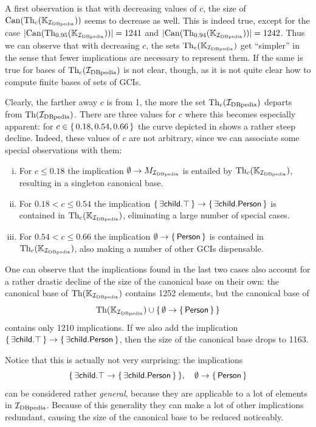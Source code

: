 A first observation is that with decreasing values of $c$, the size of $\operatorname{Can}(\operatorname{Th}_c({\mathbb{K}}_{{\mathcal{I}_{\text{DBpedia}}}}))$ seems to decrease as well.  This is indeed true, except for the case
$\lvert \operatorname{Can}(\operatorname{Th}_{0.95}({\mathbb{K}}_{{\mathcal{I}_{\text{DBpedia}}}})) \rvert = 1241$ and $\lvert \operatorname{Can}( \operatorname{Th}_{0.94}({\mathbb{K}}_{{\mathcal{I}_{\text{DBpedia}}}})) \rvert = 1242$.  Thus we can observe that with decreasing $c$, the sets
$\operatorname{Th}_c({\mathbb{K}}_{{\mathcal{I}_{\text{DBpedia}}}})$ get \enquote{simpler} in the sense that fewer implications are
necessary to represent them.  If the same is true for bases of $\operatorname{Th}_c({\mathcal{I}_{\text{DBpedia}}})$ is not
clear, though, as it is not quite clear how to compute finite bases of sets of GCIs.

Clearly, the farther away $c$ is from 1, the more the set $\operatorname{Th}_c({\mathcal{I}_{\text{DBpedia}}})$ departs from
$\operatorname{Th}({\mathcal{I}_{\text{DBpedia}}})$.  There are three values for $c$ where this becomes especially apparent:
for $c \in {\ensuremath{\{\, 0.18, 0.54, 0.66 \,\}}}$ the curve depicted in
 shows a rather steep decline.  Indeed, these values of
$c$ are not arbitrary, since we can associate some special observations with them:
\begin{enumerate}[i. ]
\item For $c \leq 0.18$ the implication $\emptyset \to M_{{\mathcal{I}_{\text{DBpedia}}}}$ is entailed by
  $\operatorname{Th}_c({\mathbb{K}}_{{\mathcal{I}_{\text{DBpedia}}}})$, resulting in a singleton canonical base.
\item For $0.18 < c \leq 0.54$ the implication ${\{\, \mathsf{\exists child. \top} \,\}} \to
  {\ensuremath{\{\, \mathsf{\exists child. Person} \,\}}}$ is contained in $\operatorname{Th}_c({\mathbb{K}}_{{\mathcal{I}_{\text{DBpedia}}}})$,
  eliminating a large number of special cases.
\item For $0.54 < c \leq 0.66$ the implication $\emptyset \to {\ensuremath{\{\, \mathsf{Person} \,\}}}$ is
  contained in $\operatorname{Th}_c({\mathbb{K}}_{{\mathcal{I}_{\text{DBpedia}}}})$, also making a number of other GCIs
  dispensable.
\end{enumerate}

One can observe that the implications found in the last two cases also account for a
rather drastic decline of the size of the canonical base on their own: the canonical base
of $\operatorname{Th}({\mathbb{K}}_{{\mathcal{I}_{\text{DBpedia}}}})$ contains 1252 elements, but the canonical base of
\begin{equation*}
  \operatorname{Th}({\mathbb{K}}_{{\mathcal{I}_{\text{DBpedia}}}}) \cup {\ensuremath{\{\, \emptyset \to {\ensuremath{\{\, \mathsf{Person} \,\}}} \,\}}}
\end{equation*}
contains only 1210 implications.  If we also add the implication ${\{\, \mathsf{\exists
    child. \top} \,\}} \to {\ensuremath{\{\, \mathsf{\exists child. Person} \,\}}}$, then the size of the
canonical base drops to 1163.

Notice that this is actually not very surprising: the implications
\begin{equation*}
  {\ensuremath{\{\, \mathsf{\exists  child. \top} \to {\ensuremath{\{\, \mathsf{\exists child. Person} \,\}}} \,\}}}, \quad
  \emptyset \to {\ensuremath{\{\, \mathsf{Person} \,\}}}
\end{equation*}
can be considered rather \emph{general}, because they are applicable to a lot of elements
in ${\mathcal{I}_{\text{DBpedia}}}$.  Because of this generality they can make a lot of other implications
redundant, causing the size of the canonical base to be reduced noticeably.


